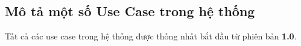 \subsection{Mô tả một số Use Case trong hệ thống}
\setcounter{subsubsection}{0}
\setcounter{figure}{0}
Tất cả các use case trong hệ thống được thống nhất bắt đầu từ phiên bản
\textbf{1.0}.




























